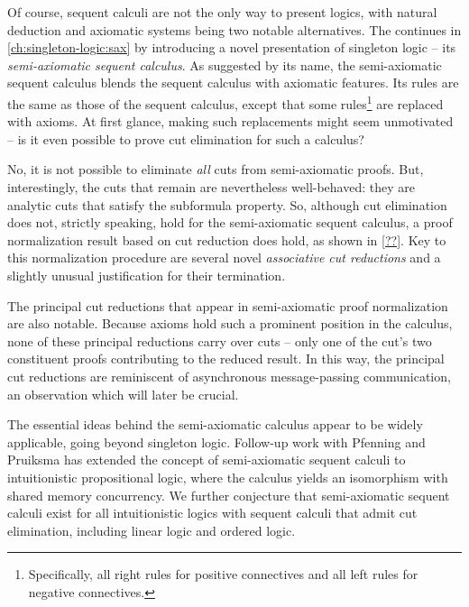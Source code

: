 Of course, sequent calculi are not the only way to present logics, with natural deduction and axiomatic systems being two notable alternatives.
The  continues in \cref{ch:singleton-logic:sax} by introducing a novel presentation of singleton logic -- its \emph{semi-axiomatic sequent calculus}.
As suggested by its name, the semi-axiomatic sequent calculus blends the sequent calculus with axiomatic features.
Its rules are the same as those of the sequent calculus, except that some rules\footnote{Specifically, all right rules for positive connectives and all left rules for negative connectives.} are replaced with axioms.
At first glance, making such replacements might seem unmotivated --
is it even possible to prove cut elimination for such a calculus?

No, it is not possible to eliminate \emph{all} cuts from semi-axiomatic proofs.
But, interestingly, the cuts that remain are nevertheless well-behaved: they are analytic cuts that satisfy the subformula property.
So, although cut elimination does not, strictly speaking, hold for the semi-axiomatic sequent calculus, a proof normalization result based on cut reduction does hold, as shown in \cref{??}.
Key to this normalization procedure are several novel \emph{associative cut reductions} and a slightly unusual justification for their termination.

The principal cut reductions that appear in semi-axiomatic proof normalization are also notable.
Because axioms hold such a prominent position in the calculus, none of these principal reductions carry over cuts -- only one of the cut's two constituent proofs contributing to the reduced result.
In this way, the principal cut reductions are reminiscent of asynchronous message-passing communication, an observation which will later be crucial.

The essential ideas behind the semi-axiomatic calculus appear to be widely applicable, going beyond singleton logic.
Follow-up work with Pfenning and Pruiksma has extended the concept of semi-axiomatic sequent calculi to intuitionistic propositional logic, where the calculus yields an isomorphism with shared memory concurrency\autocite{DeYoung+:FSCD20}.
We further conjecture that semi-axiomatic sequent calculi exist for all intuitionistic logics with sequent calculi that admit cut elimination, including linear logic and ordered logic.



